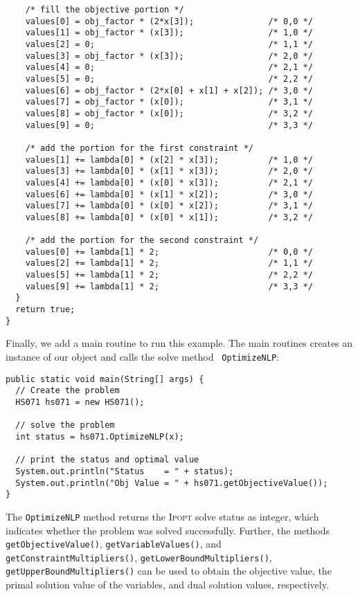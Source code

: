 \documentclass[10pt]{article}
\newcommand{\Ipopt}{\textsc{Ipopt}\xspace}
\begin{document}
\begin{verbatim}
    /* fill the objective portion */
    values[0] = obj_factor * (2*x[3]);               /* 0,0 */
    values[1] = obj_factor * (x[3]);                 /* 1,0 */
    values[2] = 0;                                   /* 1,1 */
    values[3] = obj_factor * (x[3]);                 /* 2,0 */
    values[4] = 0;                                   /* 2,1 */
    values[5] = 0;                                   /* 2,2 */
    values[6] = obj_factor * (2*x[0] + x[1] + x[2]); /* 3,0 */
    values[7] = obj_factor * (x[0]);                 /* 3,1 */
    values[8] = obj_factor * (x[0]);                 /* 3,2 */
    values[9] = 0;                                   /* 3,3 */

    /* add the portion for the first constraint */
    values[1] += lambda[0] * (x[2] * x[3]);          /* 1,0 */
    values[3] += lambda[0] * (x[1] * x[3]);          /* 2,0 */
    values[4] += lambda[0] * (x[0] * x[3]);          /* 2,1 */
    values[6] += lambda[0] * (x[1] * x[2]);          /* 3,0 */
    values[7] += lambda[0] * (x[0] * x[2]);          /* 3,1 */
    values[8] += lambda[0] * (x[0] * x[1]);          /* 3,2 */

    /* add the portion for the second constraint */
    values[0] += lambda[1] * 2;                      /* 0,0 */
    values[2] += lambda[1] * 2;                      /* 1,1 */
    values[5] += lambda[1] * 2;                      /* 2,2 */
    values[9] += lambda[1] * 2;                      /* 3,3 */
  }
  return true;
}
\end{verbatim}

\noindent Finally, we add a main routine to run this example. The main 
routines creates an instance of our object and calls the solve method {\tt 
OptimizeNLP}:
\begin{verbatim}
public static void main(String[] args) {
  // Create the problem
  HS071 hs071 = new HS071();

  // solve the problem
  int status = hs071.OptimizeNLP(x);
  
  // print the status and optimal value
  System.out.println("Status    = " + status);
  System.out.println("Obj Value = " + hs071.getObjectiveValue());
}
\end{verbatim}
The {\tt OptimizeNLP} method returns the \Ipopt solve status as integer, which 
indicates whether the problem was solved successfully.
Further, the methods {\tt getObjectiveValue()}, {\tt getVariableValues()}, and {\tt 
getConstraintMultipliers()}, {\tt getLowerBoundMultipliers()}, {\tt 
getUpperBoundMultipliers()} can be used to obtain the objective value, the primal 
solution value of the variables, and dual solution values, respectively.
\end{document}
